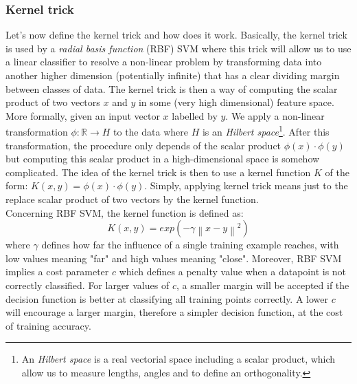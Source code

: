 \documentclass[11pt, openany]{report}
\theoremstyle{plain}
\newcommand\norm[1]{\left\lVert#1\right\rVert}
\theoremstyle{definition}
\theoremstyle{remark}
\begin{document}
\newpage
\subsubsection{Kernel trick}
Let's now define the kernel trick and how does it work. Basically, the kernel trick is used by a \textit{radial basis function} (RBF) SVM where this trick will allow us to use a linear classifier to resolve a non-linear problem by transforming data into another higher dimension (potentially infinite) that has a clear dividing margin between classes of data. The kernel trick is then a way of computing the scalar product of two vectors $x$ and $y$ in some (very high dimensional) feature space. \\

More formally, given an input vector $x$ labelled by $y$. We apply a non-linear transformation $\phi : \mathbb{R} \rightarrow H$ to the data where $H$ is an \textit{Hilbert space}\footnote{An \textit{Hilbert space} is a real vectorial space including a scalar product, which allow us to measure lengths, angles and to define an orthogonality.}. After this transformation, the procedure only depends of the scalar product $\phi(x) \cdot \phi(y)$  but computing this scalar product in a high-dimensional space is somehow complicated. The idea of the kernel trick is then to use a kernel function $K$ of the form: $K(x,y) = \phi(x) \cdot \phi(y)$. Simply, applying kernel trick means just to the replace scalar product of two vectors by the kernel function.\\ 
       

Concerning RBF SVM, the kernel function is defined as: 
$$ K(x,y) = exp( - \gamma \norm{x-y}^2 ) $$
where $\gamma$ defines how far the influence of a single training example reaches, with low values meaning "far" and high values meaning "close". Moreover, RBF SVM implies a cost  parameter $c$ which defines a penalty value when a datapoint is not correctly classified. For larger values of $c$, a smaller margin will be accepted if the decision function is better at classifying all training points correctly. A lower $c$ will encourage a larger margin, therefore a simpler decision function, at the cost of training accuracy. 
\end{document}
